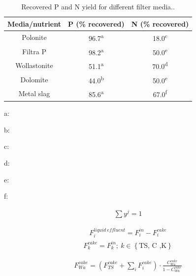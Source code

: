 \begin{refsection}[referencesCh2]
\begin{table}[h]
	\centering
	\caption{Recovered P and N yield for different filter media..}
	\label{table:Table3}
	\begin{threeparttable}
		\begin{tabular}{@{}ccc@{}}
			\toprule
			Media/nutrient & P (\% recovered) & N (\% recovered) \\ \midrule
			Polonite       & 96.7\textsuperscript{a}           & 18.0\textsuperscript{c}            \\
			Filtra P       & 98.2\textsuperscript{a}           & 50.0\textsuperscript{e}            \\
			Wollastonite   & 51.1\textsuperscript{a}           & 70.0\textsuperscript{d}            \\
			Dolomite       & 44.0\textsuperscript{b}           & 50.0\textsuperscript{e}            \\
			Metal slag     & 85.6\textsuperscript{a}           & 67.0\textsuperscript{f}            \\ \bottomrule
		\end{tabular}
	\begin{tablenotes}
		\footnotesize
		\item {a}: \citet{gustafsson2008phosphate}
		\item {b}: \citet{pant2001phosphorus}
		\item {c}: \citet{kietlinska2005evaluation}
		\item {d}: \citet{lind2000nutrient}
		\item {e}: \citet{aziz2004removal}
		\item {f}: \citet{yang2009converter}
	\end{tablenotes}
	\end{threeparttable}
\end{table}

\begin{align}
	\sum {{y}}^{{j}} { = 1} \label{eq:Eq3}
\end{align}

\begin{align}
	F_i^{{liquid \ effluent}} = F_i^{{in}} - F_{{i}}^{{cake}} \label{eq:Eq4}
\end{align}
%
\begin{align}
	F_k^{{cake}} = F_k^{{in}}; \ {k} \in \left\{ \text{TS, C ,K} \right\} \label{eq:Eq5}
\end{align}

\begin{align}
	F_{Wa}^{{cake}} = \left( {F_{TS}^{{cake}} + \sum\limits_i {F_i^{{cake}}} } \right) \cdot \frac{C_{Wa}^{cake}}{1 - C_{Wa}^{{cake}}} \label{eq:Eq6}
\end{align}


\end{refsection}
